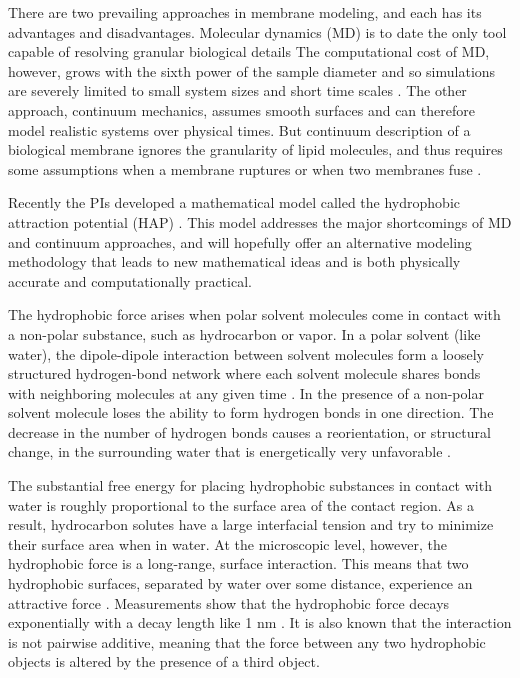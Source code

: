 There are two prevailing approaches in membrane modeling, and each has its advantages
and disadvantages. Molecular dynamics (MD) is to date the only tool capable of resolving granular biological details
The computational cost of MD, however, grows with the sixth power of the sample diameter and 
so simulations are severely limited to 
small system sizes and short time scales \cite{DiCarlo2019}.
The other approach, continuum mechanics, assumes smooth surfaces and can therefore model 
realistic systems over physical times. 
But continuum description of a biological membrane ignores the granularity of lipid molecules, and thus requires some assumptions when a
membrane ruptures or when two membranes fuse \cite{ChKo08}. 
%
%

Recently the PIs developed a mathematical model called the 
hydrophobic attraction potential (HAP) \cite{Fu2018_SIAM}.
This model addresses the major shortcomings of MD and continuum approaches,
and will hopefully offer an alternative modeling methodology that leads to new mathematical ideas 
and is both physically accurate and computationally practical. 

The hydrophobic force arises when polar solvent molecules come in contact with a non-polar substance, such as hydrocarbon or vapor.
In a polar solvent (like water), the dipole-dipole interaction between solvent molecules form a loosely structured hydrogen-bond network where
each solvent molecule shares bonds with neighboring molecules at any given time 
\cite{Israelachvili1954}. In the presence of  a non-polar solvent molecule loses the ability to form hydrogen bonds
in one direction. 
The decrease in the number of hydrogen bonds causes a reorientation, or structural
change, in the surrounding water that is energetically very unfavorable \cite{Bjorneholm2016}.


The substantial free energy for placing hydrophobic substances in contact with water 
is roughly proportional to the surface area of the contact region. 
As a result, hydrocarbon solutes have a large interfacial tension 
and try to minimize their surface area when in water. 
At the microscopic level, however, the hydrophobic force is a long-range, surface interaction. 
This means that two hydrophobic surfaces, separated by
water over some distance, experience an attractive force \cite{Lum1999,Meyer2006,Hammer2010}.
Measurements show that the hydrophobic force
decays exponentially with a decay length like 1 nm 
\cite{Israelachvili1984, Marcelja1977,Christenson2001,Lin2005}. It is also known that the interaction is not pairwise additive, meaning that the force
between any two hydrophobic objects is altered by the presence of a third  object. 

